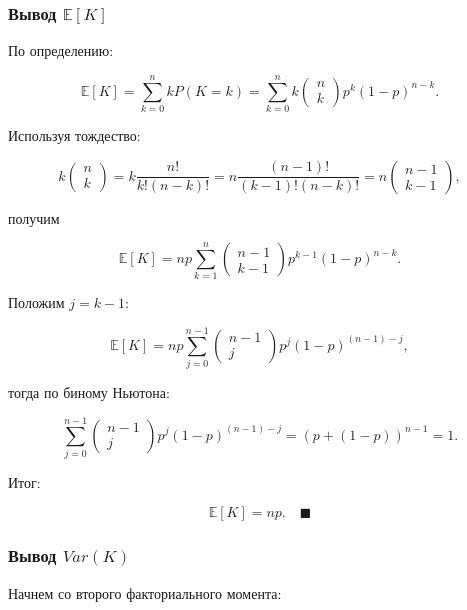 \documentclass[
  russian,
  letterpaper,
]{scrbook}
\begin{document}
\subsubsection{\texorpdfstring{\textbf{Вывод}
\(\mathbb{E}[K]\)}{Вывод \textbackslash mathbb\{E\}{[}K{]}}}\label{ux432ux44bux432ux43eux434-mathbbek}

По определению:

\[\mathbb{E}[K]=\sum_{k=0}^n kP(K=k)=\sum_{k=0}^n k \begin{pmatrix} n\\k\end{pmatrix} p^k(1-p)^{n-k}.\]

Используя тождество:

\[k \begin{pmatrix} n\\k\end{pmatrix}=k\frac{n!}{k!(n-k)!}=n\frac{(n-1)!}{(k-1)!(n-k)!}=n\begin{pmatrix} n-1\\k-1\end{pmatrix},\]

получим

\[\mathbb{E}[K]=np\sum_{k=1}^n \begin{pmatrix} n-1\\k-1\end{pmatrix}p^{k-1}(1-p)^{n-k}.\]

Положим \(j=k-1\):

\[\mathbb{E}[K]=np\sum_{j=0}^{n-1} \begin{pmatrix} n-1\\j\end{pmatrix}p^{j}(1-p)^{(n-1)-j},\]

тогда по биному Ньютона:

\[\sum_{j=0}^{n-1} \begin{pmatrix} n-1\\j\end{pmatrix}p^{j}(1-p)^{(n-1)-j}=(p+(1-p))^{n-1}=1.\]

Итог:

\[\mathbb{E}[K]=np. \quad \blacksquare\]

\subsubsection{\texorpdfstring{\textbf{Вывод}
\(Var(K)\)}{Вывод Var(K)}}\label{ux432ux44bux432ux43eux434-vark}

Начнем со второго факториального момента:
\end{document}
